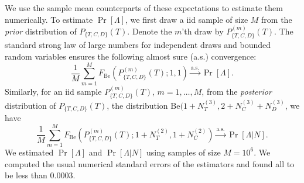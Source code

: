 \documentclass[11pt,letter]{article}
\begin{document}
We use the sample mean counterparts of these expectations to estimate them numerically.
To estimate $\Pr[\Lambda]$, we first draw a iid sample of size $M$ from the {\em prior} distribution of $P_{\{T,C,D\}}(T)$.
Denote the $m$'th draw by $P^{(m)}_{\{T,C,D\}}(T)$.
The standard strong law of large numbers for independent draws and bounded random variables ensures the following almost sure (a.s.) convergence:
\begin{equation}
  \frac{1}{M} \sum_{m=1}^M F_{\mathrm{Be}}(P^{(m)}_{\{T,C,D\}}(T); 1, 1)
  \overset{\text{a.s.}}{\longrightarrow} \Pr[\Lambda].
\end{equation}
Similarly, for an iid sample $P^{(m)}_{\{T,C,D\}}(T)$, $m=1,\ldots,M$, from the {\em posterior} distribution of $P_{\{T,C,D\}}(T)$, the distribution $\mathrm{Be}(1 + N_T^{(3)}, 2 + N_C^{(3)} + N_D^{(3)}$, we have
\begin{equation}
  \frac{1}{M} \sum_{m=1}^M F_{\mathrm{Be}}(P^{(m)}_{\{T,C,D\}}(T);
  1 + N_T^{(2)}, 1 + N_C^{(2)})
  \overset{\text{a.s.}}{\longrightarrow} \Pr[\Lambda|N].
\end{equation}
We estimated $\Pr[\Lambda]$ and $\Pr[\Lambda|N]$ using samples of size $M = 10^6$.
We computed the usual numerical standard errors of the estimators and found all to be less than 0.0003.

\fi



\end{document}
